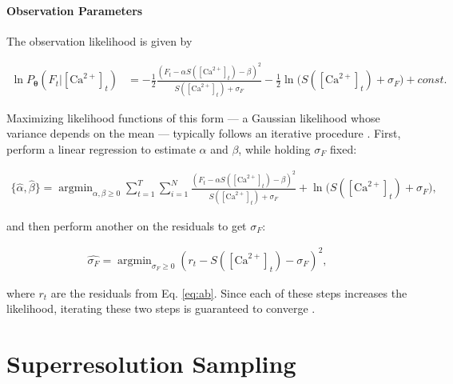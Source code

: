 \documentclass[12pt]{article}
\providecommand{\ve}[1]{\boldsymbol{#1}}
\providecommand{\ve}[1]{\boldsymbol{#1}}
\DeclareMathOperator*{\argmin}{argmin}
\newcommand{\thetn}{\ve{\theta}}
\newcommand{\p}{P_{\thetn}}
\newcommand{\Ca}{[\text{Ca}^{2+}]}
\begin{document}
\paragraph{Observation Parameters}

The observation likelihood is given by

\begin{align} \label{eq:obs_lik2}
\ln \p(F_t | \Ca_t) &= -\frac{1}{2} \frac{(F_t-\alpha S(\Ca_t) - \beta)^2}{S(\Ca_t) + \sigma_F} -\frac{1}{2} \ln \big(S(\Ca_t) + \sigma_F) +const.
\end{align}

\noindent Maximizing likelihood functions of this form --- a Gaussian likelihood whose variance depends on the mean --- typically follows an iterative procedure  \cite{ShumwayStoffer06}.  First, perform a linear regression to estimate $\alpha$ and $\beta$, while holding $\sigma_F$ fixed:

\begin{align} \label{eq:ab}
\{\widehat{\alpha}, \widehat{\beta}\} = \argmin_{\alpha, \beta \geq 0} \sum_{t=1}^T \sum_{i=1}^N  \frac{(F_t-\alpha S(\Ca_t) - \beta)^2}{S(\Ca_t) + \sigma_F} + \ln\big( S(\Ca_t) + \sigma_F\big),
\end{align}

\noindent and then perform another on the residuals to get $\sigma_F$:

\begin{align}
\widehat{\sigma_F} = \argmin_{\sigma_F \geq 0} (r_t-S(\Ca_t) - \sigma_F)^2,
\end{align}

\noindent where $r_t$ are the residuals from Eq. \ref{eq:ab}.  Since each of these steps increases the likelihood, iterating these two steps is guaranteed to converge  \cite{ShumwayStoffer06}.

\section{Superresolution Sampling} \label{sec:super}
\end{document}
